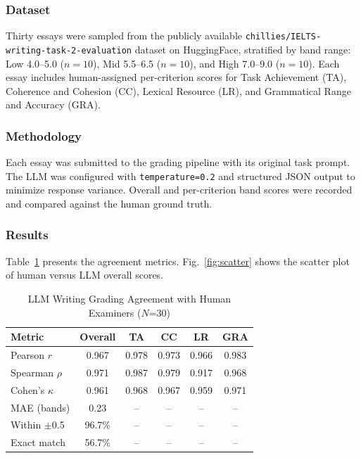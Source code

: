 \documentclass[conference]{IEEEtran}
\begin{document}
\subsubsection{Dataset}
Thirty essays were sampled from the publicly available \texttt{chillies/IELTS-writing-task-2-evaluation} dataset on HuggingFace, stratified by band range: Low 4.0--5.0 ($n=10$), Mid 5.5--6.5 ($n=10$), and High 7.0--9.0 ($n=10$). Each essay includes human-assigned per-criterion scores for Task Achievement (TA), Coherence and Cohesion (CC), Lexical Resource (LR), and Grammatical Range and Accuracy (GRA).

\subsubsection{Methodology}
Each essay was submitted to the grading pipeline with its original task prompt. The LLM was configured with \texttt{temperature=0.2} and structured JSON output to minimize response variance. Overall and per-criterion band scores were recorded and compared against the human ground truth.

\subsubsection{Results}
Table~\ref{tab:grading} presents the agreement metrics. Fig.~\ref{fig:scatter} shows the scatter plot of human versus LLM overall scores.

\begin{table}[!t]
\caption{LLM Writing Grading Agreement with Human Examiners ($N$=30)}
\label{tab:grading}
\centering
\begin{tabular}{lccccc}
\toprule
\textbf{Metric} & \textbf{Overall} & \textbf{TA} & \textbf{CC} & \textbf{LR} & \textbf{GRA} \\
\midrule
Pearson $r$      & 0.967 & 0.978 & 0.973 & 0.966 & 0.983 \\
Spearman $\rho$  & 0.971 & 0.987 & 0.979 & 0.917 & 0.968 \\
Cohen's $\kappa$ & 0.961 & 0.968 & 0.967 & 0.959 & 0.971 \\
\midrule
MAE (bands)      & 0.23 & -- & -- & -- & -- \\
Within $\pm$0.5  & 96.7\% & -- & -- & -- & -- \\
Exact match      & 56.7\% & -- & -- & -- & -- \\
\bottomrule
\end{tabular}
\end{table}
\end{document}
